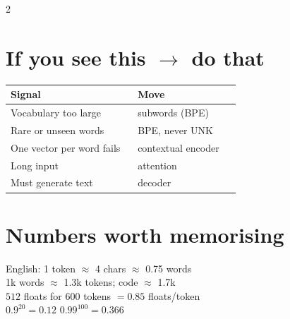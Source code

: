 \documentclass[11pt,a4paper]{article}
\newcommand{\sect}[1]{\section*{#1}}
\begin{document}
\begin{multicols}{2}
\sect{If you see this $\rightarrow$ do that}
\begin{tabular}{@{}p{0.52\linewidth}p{0.42\linewidth}@{}}
\toprule
Signal & Move\\
\midrule
Vocabulary too large & subwords (BPE)\\
Rare or unseen words & BPE, never UNK\\
One vector per word fails & contextual encoder\\
Long input & attention\\
Must generate text & decoder\\
\bottomrule
\end{tabular}


\sect{Numbers worth memorising}
English: 1 token $\approx$ 4 chars $\approx$ 0.75 words\\
1k words $\approx$ 1.3k tokens; code $\approx$ 1.7k\\
$512$ floats for $600$ tokens $=0.85$ floats/token\\
$0.9^{20}=0.12$ \quad $0.99^{100}=0.366$

\end{multicols}
\end{document}
